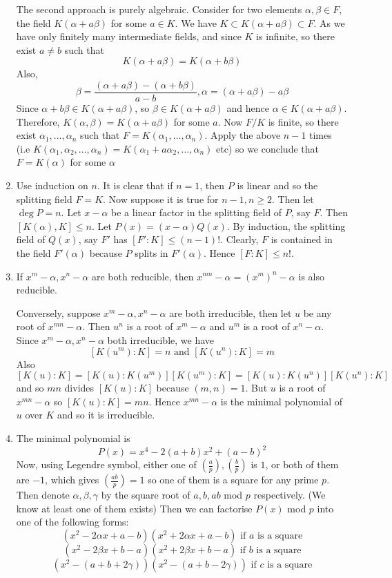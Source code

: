 \begin{enumerate}
    The second approach is purely algebraic. Consider for two elements $\alpha,\beta \in F$, the field
    $K(\alpha+a\beta)$ for some $a \in K$. We have $K \subset K(\alpha+a\beta) \subset F$. As we have only finitely many intermediate fields, and since $K$ is infinite, so there exist $a \neq b$ such that
    $$K(\alpha+a\beta)=K(\alpha+b\beta)$$
    Also,
    $$\beta=\frac{(\alpha+a\beta)-(\alpha+b\beta)}{a-b}, \alpha=(\alpha+a\beta)-a\beta$$
    Since $\alpha+b\beta \in K(\alpha+a\beta)$, so $\beta \in K(\alpha+a\beta)$ and hence
    $\alpha \in K(\alpha+a\beta)$. Therefore, $K(\alpha,\beta)=K(\alpha+a\beta)$ for some $a$.
    Now $F/K$ is finite, so there exist $\alpha_1,\ldots,\alpha_n$ such that
    $F=K(\alpha_1,\ldots,\alpha_n)$. Apply the above $n-1$ times
    (i.e $K(\alpha_1,\alpha_2,\ldots,\alpha_n)=K(\alpha_1+a\alpha_2,\ldots,\alpha_n)$ etc)
    so we conclude that
    $F=K(\alpha)$ for some $\alpha$
\item Use induction on $n$. It is clear that if $n=1$, then $P$ is linear and so the splitting field $F=K$.
    Now suppose it is true for $n-1, n \ge 2$. Then let $\deg{P}=n$. Let $x-\alpha$ be a linear factor in the splitting field of $P$, say $F$. Then $[K(\alpha),K] \le n$. Let $P(x)=(x-\alpha)Q(x)$. By induction, the splitting field of $Q(x)$, say $F'$ has $[F':K] \le (n-1)!$. Clearly, $F$ is contained in the field
    $F'(\alpha)$ because $P$ splits in $F'(\alpha)$. Hence $[F:K] \le n!$.\\
\item If $x^m-\alpha,x^n-\alpha$ are both reducible, then $x^{mn}-\alpha=(x^{m})^n-\alpha$ is also reducible.

     Conversely, suppose $x^m-\alpha,x^n-\alpha$ are both irreducible, then let $u$ be any root of $x^{mn}-\alpha$.
     Then $u^n$ is a root of $x^m-\alpha$ and $u^m$ is a root of $x^n-\alpha$. Since $x^m-\alpha,x^n-\alpha$ both irreducible, we have $$[K(u^m):K]=n \text{ and } [K(u^n):K]=m$$
     Also $$[K(u):K]=[K(u):K(u^m)][K(u^m):K]=[K(u):K(u^n)][K(u^n):K]$$
     and so $mn$ divides $[K(u):K]$ because $(m,n)=1$.
     But $u$ is a root of $x^{mn}-\alpha$ so $[K(u):K] = mn$. Hence $x^{mn}-\alpha$ is the minimal polynomial of $u$ over $K$ and so it is irreducible.\\
\item The minimal polynomial is
     $$P(x)=x^4-2(a+b)x^2+(a-b)^2$$
     Now, using Legendre symbol, either one of  $(\frac{a}{p}),(\frac{b}{p})$ is $1$, or both of them are $-1$, which gives $(\frac{ab}{p})=1$ so one of them is a square for any prime $p$. Then denote
     $\alpha,\beta,\gamma$ by the square root of $a,b,ab$ mod $p$ respectively. (We know at least one of them exists)
     Then we can factorise $P(x)$ mod $p$ into one of the following forms:
     $$(x^2-2\alpha x+a-b)(x^2+2\alpha x+ a-b) \text{ if } a \text{ is a square}$$
     $$(x^2-2\beta x +b-a)(x^2+2\beta x +b-a) \text{ if } b \text{ is a square}$$
     $$(x^2-(a+b+2 \gamma))(x^2-(a+b-2\gamma)) \text{ if } c \text{ is a square}$$
\end{enumerate}
